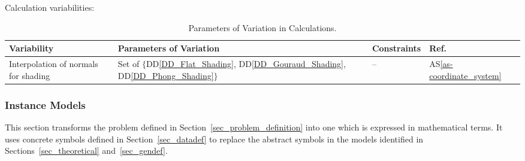 \documentclass[12pt]{article}
\newcommand{\ddref}[1]{DD\ref{#1}}
\newcommand{\aSref}[1]{AS\ref{#1}}
\begin{document}
\begin{table}[H]
	\caption{Parameters of Variation for Input.}
	\label{tbl:Input_Variations}
\end{table}

Calculation variabilities:
\begin{table}[h]
	\centering
	\begin{tabular}{|p{5cm}|p{5cm}|p{2cm}|p{2cm}|}
		\hline
		\textbf{Variability} & \textbf{Parameters of Variation} & Constraints & 
		\textbf{Ref.}\\
		\hline
		Interpolation of normals for shading & Set of 
		$\{$\ddref{DD_Flat_Shading}, \ddref{DD_Gouraud_Shading}, 
		\ddref{DD_Phong_Shading}$\}$ & -- & \aSref{as-coordinate_system} \\
		\hline		
	\end{tabular}
	\caption{Parameters of Variation in Calculations.}
\end{table}

\subsubsection{Instance Models} \label{sec_instance}    

This section transforms the problem defined in 
Section~\ref{sec_problem_definition} into one which is expressed in 
mathematical terms. It uses concrete symbols defined in 
Section~\ref{sec_datadef} to replace the abstract symbols in the models 
identified in Sections~\ref{sec_theoretical} and~\ref{sec_gendef}.
\end{document}

